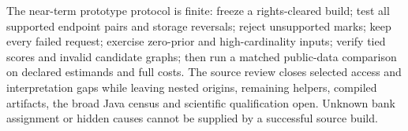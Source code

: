 The near-term prototype protocol is finite: freeze a rights-cleared build;
test all supported endpoint pairs and storage reversals; reject unsupported
marks; keep every failed request; exercise zero-prior and high-cardinality
inputs; verify tied scores and invalid candidate graphs; then run a matched
public-data comparison on declared estimands and full costs. The source
review closes selected access and interpretation gaps while leaving nested
origins, remaining helpers, compiled artifacts, the broad Java census and
scientific qualification open. Unknown bank assignment or hidden causes
cannot be supplied by a successful source build.\citep{exec28_nested_sources}
